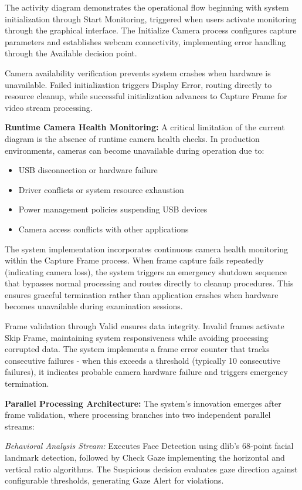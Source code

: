 \documentclass[conference]{IEEEtran}
\begin{document}
The activity diagram demonstrates the operational flow beginning with system 
initialization through Start Monitoring, triggered when users activate monitoring 
through the graphical interface. The Initialize Camera process configures capture 
parameters and establishes webcam connectivity, implementing error handling through 
the Available decision point.

Camera availability verification prevents system crashes 
when hardware is unavailable. Failed initialization triggers Display Error, 
routing directly to resource cleanup, while successful initialization advances to 
Capture Frame for video stream processing.

\textbf{Runtime Camera Health Monitoring:} A critical limitation of the current 
diagram is the absence of runtime camera health checks. In production environments, 
cameras can become unavailable during operation due to:
\begin{itemize}
    \item USB disconnection or hardware failure
    \item Driver conflicts or system resource exhaustion  
    \item Power management policies suspending USB devices
    \item Camera access conflicts with other applications
\end{itemize}

The system implementation incorporates continuous camera health monitoring within 
the Capture Frame process. When frame capture fails repeatedly (indicating camera 
loss), the system triggers an emergency shutdown sequence that bypasses normal 
processing and routes directly to cleanup procedures. This ensures graceful 
termination rather than application crashes when hardware becomes unavailable 
during examination sessions.

Frame validation through Valid ensures data integrity. Invalid frames 
activate Skip Frame, maintaining system responsiveness while avoiding processing 
corrupted data. The system implements a frame error counter that tracks consecutive 
failures - when this exceeds a threshold (typically 10 consecutive failures), 
it indicates probable camera hardware failure and triggers emergency termination.

\textbf{Parallel Processing Architecture:} The system's innovation emerges after 
frame validation, where processing branches into two independent parallel streams:

\textit{Behavioral Analysis Stream:} Executes Face Detection using dlib's 68-point 
facial landmark detection, followed by Check Gaze implementing the horizontal 
and vertical ratio algorithms. The Suspicious decision evaluates gaze direction 
against configurable thresholds, generating Gaze Alert for violations.
\end{document}
